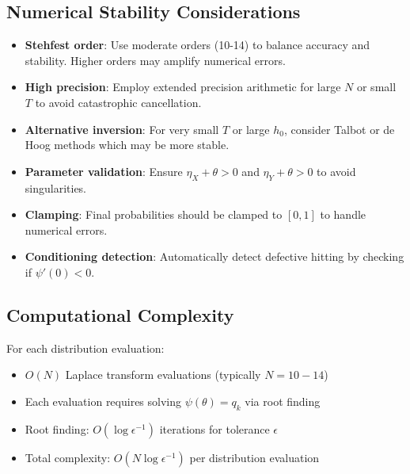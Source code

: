 \documentclass{article}
\theoremstyle{definition}
\begin{document}
\subsection{Numerical Stability Considerations}

\begin{itemize}
    \item \textbf{Stehfest order}: Use moderate orders (10-14) to balance accuracy and stability. Higher orders may amplify numerical errors.
    \item \textbf{High precision}: Employ extended precision arithmetic for large $N$ or small $T$ to avoid catastrophic cancellation.
    \item \textbf{Alternative inversion}: For very small $T$ or large $h_0$, consider Talbot or de Hoog methods which may be more stable.
    \item \textbf{Parameter validation}: Ensure $\eta_X + \theta > 0$ and $\eta_Y + \theta > 0$ to avoid singularities.
    \item \textbf{Clamping}: Final probabilities should be clamped to $[0,1]$ to handle numerical errors.
    \item \textbf{Conditioning detection}: Automatically detect defective hitting by checking if $\psi'(0) < 0$.
\end{itemize}

\subsection{Computational Complexity}

For each distribution evaluation:
\begin{itemize}
    \item $O(N)$ Laplace transform evaluations (typically $N = 10-14$)
    \item Each evaluation requires solving $\psi(\theta) = q_k$ via root finding
    \item Root finding: $O(\log \epsilon^{-1})$ iterations for tolerance $\epsilon$
    \item Total complexity: $O(N \log \epsilon^{-1})$ per distribution evaluation
\end{itemize}




\end{document}
